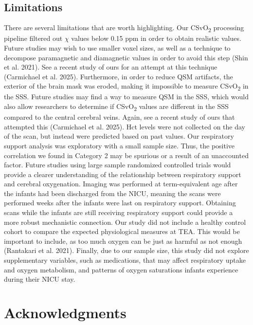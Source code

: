 \documentclass[
  letterpaper,
  DIV=11,
  numbers=noendperiod]{scrartcl}
\begin{document}
\subsection{Limitations}\label{limitations}

There are several limitations that are worth highlighting. Our
CSvO\textsubscript{2} processing pipeline filtered out \(\chi\) values
below 0.15 ppm in order to obtain realistic values. Future studies may
wish to use smaller voxel sizes, as well as a technique to decompose
paramagnetic and diamagnetic values in order to avoid this step (Shin et
al. 2021). See a recent study of ours for an attempt at this technique
(Carmichael et al. 2025). Furthermore, in order to reduce QSM artifacts,
the exterior of the brain mask was eroded, making it impossible to
measure CSvO\textsubscript{2} in the SSS. Future studies may find a way
to measure QSM in the SSS, which would also allow researchers to
determine if CSvO\textsubscript{2} values are different in the SSS
compared to the central cerebral veins. Again, see a recent study of
ours that attempted this (Carmichael et al. 2025). Hct levels were not
collected on the day of the scan, but instead were predicted based on
past values. Our respiratory support analysis was exploratory with a
small sample size. Thus, the positive correlation we found in Category 2
may be spurious or a result of an unaccounted factor. Future studies
using large sample randomized controlled trials would provide a clearer
understanding of the relationship between respiratory support and
cerebral oxygenation. Imaging was performed at term-equivalent age after
the infants had been discharged from the NICU, meaning the scans were
performed weeks after the infants were last on respiratory support.
Obtaining scans while the infants are still receiving respiratory
support could provide a more robust mechanistic connection. Our study
did not include a healthy control cohort to compare the expected
physiological measures at TEA. This would be important to include, as
too much oxygen can be just as harmful as not enough (Rantakari et al.
2021). Finally, due to our sample size, this study did not explore
supplementary variables, such as medications, that may affect
respiratory uptake and oxygen metabolism, and patterns of oxygen
saturations infants experience during their NICU stay.

\section{Acknowledgments}\label{acknowledgments}
\end{document}
